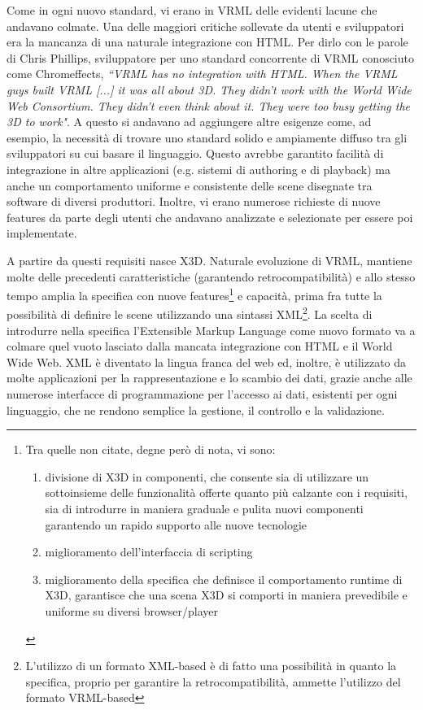 Come in ogni nuovo standard, vi erano in VRML delle evidenti lacune che andavano colmate. Una delle maggiori critiche sollevate da utenti e sviluppatori era la mancanza di una naturale integrazione con HTML. Per dirlo con le parole di Chris Phillips, sviluppatore per uno standard concorrente di VRML conosciuto come Chromeffects, \textit{``VRML has no integration with HTML. When the VRML guys built VRML [...] it was all about 3D. They didn't work with the World Wide Web Consortium. They didn't even think about it. They were too busy getting the 3D to work"}. A questo si andavano ad aggiungere altre esigenze come, ad esempio, la necessità di trovare uno standard solido e ampiamente diffuso tra gli sviluppatori su cui basare il linguaggio. Questo avrebbe garantito facilità di integrazione in altre applicazioni (e.g. sistemi di authoring e di playback) ma anche un comportamento uniforme e consistente delle scene disegnate tra software di diversi produttori. Inoltre, vi erano numerose richieste di nuove features da parte degli utenti che andavano analizzate e selezionate per essere poi implementate.

A partire da questi requisiti nasce X3D. Naturale evoluzione di  VRML, mantiene molte delle precedenti caratteristiche (garantendo retrocompatibilità) e allo stesso tempo amplia la specifica con nuove features\footnote{Tra quelle non citate, degne però di nota,  vi sono:
\begin{enumerate} 
    \item divisione di X3D in componenti, che consente sia di utilizzare un sottoinsieme delle funzionalità offerte quanto più calzante con i requisiti, sia di introdurre in maniera graduale e pulita nuovi componenti garantendo un rapido supporto alle nuove tecnologie
    \item miglioramento dell'interfaccia di scripting
    \item miglioramento della specifica che definisce il comportamento runtime di X3D, garantisce che una scena X3D si comporti in maniera prevedibile e uniforme su diversi browser/player
\end{enumerate}} e capacità, prima fra tutte la possibilità di definire le scene utilizzando una sintassi XML\footnote{L'utilizzo di un formato XML-based è di fatto una possibilità in quanto la specifica, proprio per garantire la retrocompatibilità, ammette l'utilizzo del formato VRML-based}. La scelta di introdurre nella specifica l'Extensible Markup Language come nuovo formato va a colmare quel vuoto lasciato dalla mancata integrazione con HTML e il World Wide Web. XML è diventato la lingua franca del web ed, inoltre, è utilizzato da molte applicazioni per la rappresentazione e lo scambio dei dati, grazie anche alle numerose interfacce di programmazione per l'accesso ai dati, esistenti per ogni linguaggio, che ne rendono semplice la gestione, il controllo e la validazione.

